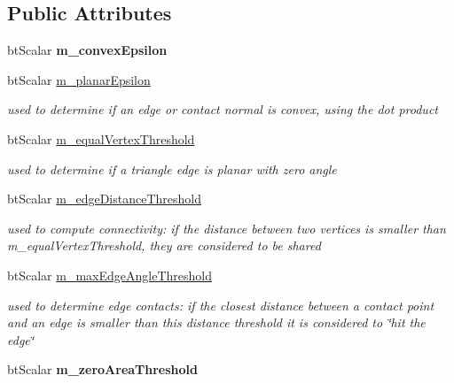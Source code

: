 \subsection*{Public Attributes}
\begin{DoxyCompactItemize}
\item 
\mbox{\label{structbtTriangleInfoMap_ac471ee4ba8b753d2f8298fad2bdcda5e}} 
bt\+Scalar {\bfseries m\+\_\+convex\+Epsilon}
\item 
\mbox{\label{structbtTriangleInfoMap_a7516c96369cd0eef22286b7e5ad537e8}} 
bt\+Scalar \hyperlink{structbtTriangleInfoMap_a7516c96369cd0eef22286b7e5ad537e8}{m\+\_\+planar\+Epsilon}
\begin{DoxyCompactList}\small\item\em used to determine if an edge or contact normal is convex, using the dot product \end{DoxyCompactList}\item 
\mbox{\label{structbtTriangleInfoMap_aa980d33e5be082442a128f0ba2efb064}} 
bt\+Scalar \hyperlink{structbtTriangleInfoMap_aa980d33e5be082442a128f0ba2efb064}{m\+\_\+equal\+Vertex\+Threshold}
\begin{DoxyCompactList}\small\item\em used to determine if a triangle edge is planar with zero angle \end{DoxyCompactList}\item 
\mbox{\label{structbtTriangleInfoMap_a521c0769aefc5c02b8394f924127dfc5}} 
bt\+Scalar \hyperlink{structbtTriangleInfoMap_a521c0769aefc5c02b8394f924127dfc5}{m\+\_\+edge\+Distance\+Threshold}
\begin{DoxyCompactList}\small\item\em used to compute connectivity\+: if the distance between two vertices is smaller than m\+\_\+equal\+Vertex\+Threshold, they are considered to be \textquotesingle{}shared\textquotesingle{} \end{DoxyCompactList}\item 
\mbox{\label{structbtTriangleInfoMap_a3fca61db63fe0db431044d0eba95107a}} 
bt\+Scalar \hyperlink{structbtTriangleInfoMap_a3fca61db63fe0db431044d0eba95107a}{m\+\_\+max\+Edge\+Angle\+Threshold}
\begin{DoxyCompactList}\small\item\em used to determine edge contacts\+: if the closest distance between a contact point and an edge is smaller than this distance threshold it is considered to \char`\"{}hit the edge\char`\"{} \end{DoxyCompactList}\item 
\mbox{\label{structbtTriangleInfoMap_a5a218d3c04023fb08543f2cf8b50cd76}} 
bt\+Scalar {\bfseries m\+\_\+zero\+Area\+Threshold}
\end{DoxyCompactItemize}
